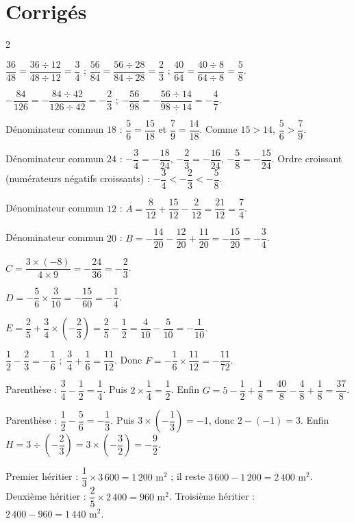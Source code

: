 \section{Corrigés}
\begin{multicols}{2}

$\dfrac{36}{48}=\dfrac{36\div12}{48\div12}=\dfrac34$ ;\quad
$\dfrac{56}{84}=\dfrac{56\div28}{84\div28}=\dfrac23$ ;\quad
$\dfrac{40}{64}=\dfrac{40\div8}{64\div8}=\dfrac58$.

$-\dfrac{84}{126}=-\dfrac{84\div42}{126\div42}=-\dfrac23$ ;\quad
$-\dfrac{56}{98}=-\dfrac{56\div14}{98\div14}=-\dfrac47$.

Dénominateur commun $18$ : $\dfrac56=\dfrac{15}{18}$ et $\dfrac79=\dfrac{14}{18}$. Comme
$15>14$, $\dfrac56>\dfrac79$.

Dénominateur commun $24$ : $-\dfrac34=-\dfrac{18}{24}$, $-\dfrac23=-\dfrac{16}{24}$,
$-\dfrac58=-\dfrac{15}{24}$. Ordre croissant (numérateurs négatifs croissants) :
$-\dfrac34<-\dfrac23<-\dfrac58$.

Dénominateur commun $12$ : $A=\dfrac8{12}+\dfrac{15}{12}-\dfrac2{12}=\dfrac{21}{12}=\dfrac74$.

Dénominateur commun $20$ : $B=-\dfrac{14}{20}-\dfrac{12}{20}+\dfrac{11}{20}=-\dfrac{15}{20}=-\dfrac34$.

$C=\dfrac{3\times(-8)}{4\times9}=-\dfrac{24}{36}=-\dfrac23$.

$D=-\dfrac56\times\dfrac3{10}=-\dfrac{15}{60}=-\dfrac14$.

$E=\dfrac25+\dfrac34\times\left(-\dfrac23\right)=\dfrac25-\dfrac12=\dfrac4{10}-\dfrac5{10}=-\dfrac1{10}$.

$\dfrac12-\dfrac23=-\dfrac16$ ;\ $\dfrac34+\dfrac16=\dfrac{11}{12}$. Donc
$F=-\dfrac16\times\dfrac{11}{12}=-\dfrac{11}{72}$.

Parenthèse : $\dfrac34-\dfrac12=\dfrac14$. Puis $2\times\dfrac14=\dfrac12$. Enfin
$G=5-\dfrac12+\dfrac18=\dfrac{40}8-\dfrac48+\dfrac18=\dfrac{37}8$.

Parenthèse : $\dfrac12-\dfrac56=-\dfrac13$. Puis $3\times\left(-\dfrac13\right)=-1$, donc
$2-(-1)=3$. Enfin $H=3\div\left(-\dfrac23\right)=3\times\left(-\dfrac32\right)=-\dfrac92$.

Premier héritier : $\dfrac13\times3\,600=1\,200\text{ m}^2$ ; il reste
$3\,600-1\,200=2\,400\text{ m}^2$. Deuxième héritier : $\dfrac25\times2\,400=960\text{ m}^2$.
Troisième héritier : $2\,400-960=1\,440\text{ m}^2$.


\end{multicols}
